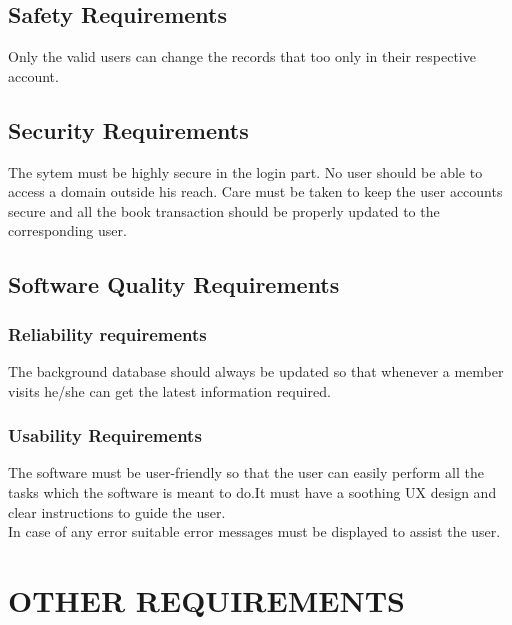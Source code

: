 \documentclass{article}
\begin{document}
\subsection{Safety Requirements}
Only the valid users can change the records that too only in their respective account.
\subsection{Security Requirements}
The sytem must be highly secure in the login part.
No user should be able to access a domain outside his reach.
Care must be taken to keep the user accounts secure and all the book transaction should be properly updated to the corresponding user.

\subsection{Software Quality Requirements}



\subsubsection{Reliability requirements}
The background database should always be updated so that whenever a member visits he/she can get the latest information required.
\subsubsection{Usability Requirements}
The software must be user-friendly so that the user can easily perform all the tasks which the software is meant to do.It must have a soothing UX design and clear instructions to guide the user.
\\In case of any error suitable error messages must be displayed to assist the user.


\section{OTHER REQUIREMENTS}
\end{document}
